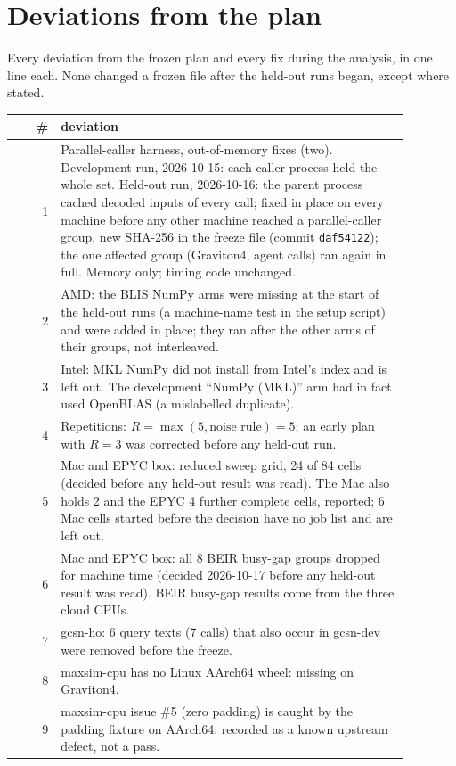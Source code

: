 \section{Deviations from the plan}
\label{app:deviations}

Every deviation from the frozen plan and every fix during the analysis, in one line each.
None changed a frozen file after the held-out runs began, except where stated.

\begin{small}
\begin{longtable}{rp{0.88\linewidth}}
\toprule
\# & deviation \\
\midrule
\endhead
1 & Parallel-caller harness, out-of-memory fixes (two). Development run, 2026-10-15: each caller process held the whole set. Held-out run, 2026-10-16: the parent process cached decoded inputs of every call; fixed in place on every machine before any other machine reached a parallel-caller group, new SHA-256 in the freeze file (commit \texttt{daf54122}); the one affected group (Graviton4, agent calls) ran again in full. Memory only; timing code unchanged. \\
2 & AMD: the BLIS NumPy arms were missing at the start of the held-out runs (a machine-name test in the setup script) and were added in place; they ran after the other arms of their groups, not interleaved. \\
3 & Intel: MKL NumPy did not install from Intel's index and is left out. The development ``NumPy (MKL)'' arm had in fact used OpenBLAS (a mislabelled duplicate). \\
4 & Repetitions: $R = \max(5, \text{noise rule}) = 5$; an early plan with $R = 3$ was corrected before any held-out run. \\
5 & Mac and EPYC box: reduced sweep grid, 24 of 84 cells (decided before any held-out result was read). The Mac also holds 2 and the EPYC 4 further complete cells, reported; 6 Mac cells started before the decision have no job list and are left out. \\
6 & Mac and EPYC box: all 8 BEIR busy-gap groups dropped for machine time (decided 2026-10-17 before any held-out result was read). BEIR busy-gap results come from the three cloud CPUs. \\
7 & gcsn-ho: 6 query texts (7 calls) that also occur in gcsn-dev were removed before the freeze. \\
8 & maxsim-cpu has no Linux AArch64 wheel: missing on Graviton4. \\
9 & maxsim-cpu issue \#5 (zero padding) is caught by the padding fixture on AArch64; recorded as a known upstream defect, not a pass. \\

\end{longtable}
\end{small}
